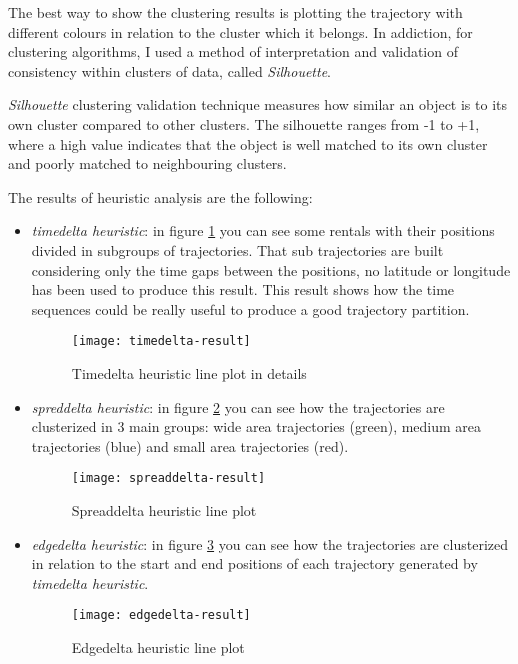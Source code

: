 The best way to show the clustering results is plotting the trajectory with different colours in relation to the cluster which it belongs. In addiction, for clustering algorithms, I used a method of interpretation and validation of consistency within clusters of data, called \textit{Silhouette}. 

\textit{Silhouette} clustering validation technique measures how similar an object is to its own cluster compared to other clusters. The silhouette ranges from -1 to +1, where a high value indicates that the object is well matched to its own cluster and poorly matched to neighbouring clusters.

The results of heuristic analysis are the following: 
\begin{itemize}
	\item \textit{timedelta heuristic}: in figure \ref{fig:timedelta-result} you can see some rentals with their positions divided in subgroups of trajectories. That sub trajectories are built considering only the time gaps between the positions, no latitude or longitude has been used to produce this result. This result shows how the time sequences could be really useful to produce a good trajectory partition.
	
	\begin{figure}[bt]
		\centering
		\texttt{[image: timedelta-result]}
		\caption{Timedelta heuristic line plot in details}
		\label{fig:timedelta-result}
	\end{figure}
	
	\item \textit{spreddelta heuristic}: in figure \ref{fig:spreaddelta-result} you can see how the trajectories are clusterized in 3 main groups: wide area trajectories (green), medium area trajectories (blue) and small area trajectories (red).
	
	\begin{figure}[bt]
		\centering
		\texttt{[image: spreaddelta-result]}
		\caption{Spreaddelta heuristic line plot}
		\label{fig:spreaddelta-result}
	\end{figure}
	
	\item \textit{edgedelta heuristic}: in figure \ref{fig:edgedelta-result} you can see how the trajectories are clusterized in relation to the start and end positions of each trajectory generated by \textit{timedelta heuristic}. 
	
	\begin{figure}[bt]
		\centering
		\texttt{[image: edgedelta-result]}
		\caption{Edgedelta heuristic line plot}
		\label{fig:edgedelta-result}
	\end{figure}
	
\end{itemize}

